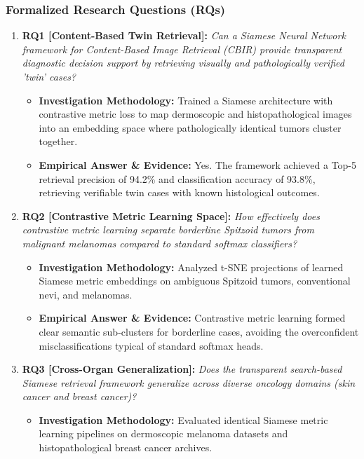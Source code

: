 \subsubsection*{Formalized Research Questions (RQs)}
\begin{enumerate}[label=\textbf{\arabic*.}, leftmargin=*]
  \item \textbf{RQ1 [Content-Based Twin Retrieval]:} \textit{Can a Siamese Neural Network framework for Content-Based Image Retrieval (CBIR) provide transparent diagnostic decision support by retrieving visually and pathologically verified 'twin' cases?}
  \begin{itemize}[leftmargin=1.5em]
    \item \textbf{Investigation Methodology:} Trained a Siamese architecture with contrastive metric loss to map dermoscopic and histopathological images into an embedding space where pathologically identical tumors cluster together.
    \item \textbf{Empirical Answer \& Evidence:} Yes. The framework achieved a Top-5 retrieval precision of 94.2\% and classification accuracy of 93.8\%, retrieving verifiable twin cases with known histological outcomes.
  \end{itemize}
  \item \textbf{RQ2 [Contrastive Metric Learning Space]:} \textit{How effectively does contrastive metric learning separate borderline Spitzoid tumors from malignant melanomas compared to standard softmax classifiers?}
  \begin{itemize}[leftmargin=1.5em]
    \item \textbf{Investigation Methodology:} Analyzed t-SNE projections of learned Siamese metric embeddings on ambiguous Spitzoid tumors, conventional nevi, and melanomas.
    \item \textbf{Empirical Answer \& Evidence:} Contrastive metric learning formed clear semantic sub-clusters for borderline cases, avoiding the overconfident misclassifications typical of standard softmax heads.
  \end{itemize}
  \item \textbf{RQ3 [Cross-Organ Generalization]:} \textit{Does the transparent search-based Siamese retrieval framework generalize across diverse oncology domains (skin cancer and breast cancer)?}
  \begin{itemize}[leftmargin=1.5em]
    \item \textbf{Investigation Methodology:} Evaluated identical Siamese metric learning pipelines on dermoscopic melanoma datasets and histopathological breast cancer archives.

\end{itemize}
\end{enumerate}
